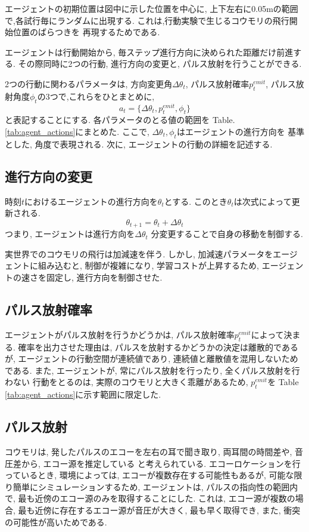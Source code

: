 \documentclass[../main]{subfiles}
\begin{document}
エージェントの初期位置は図中に示した位置を中心に,
上下左右に0.05\si{m}の範囲で,各試行毎にランダムに出現する.
これは,行動実験で生じるコウモリの飛行開始位置のばらつきを
再現するためである.

エージェントは行動開始から, 
毎ステップ進行方向に決められた距離だけ前進する.
その際同時に2つの行動, 
進行方向の変更と,
パルス放射を行うことができる.

2つの行動に関わるパラメータは,
方向変更角$\Delta\theta_t$,
パルス放射確率$p^{emit}_t$,
パルス放射角度$\phi_t$の3つで,これらをひとまとめに,
$$a_t=\{\Delta\theta_t, p^{emit}_t, \phi_t \}$$
と表記することにする.
各パラメータのとる値の範囲を
Table.\ref{tab:agent_actions}にまとめた.
ここで, $\Delta\theta_t, \phi_t$はエージェントの進行方向を
基準とした, 角度で表現される.
次に, エージェントの行動の詳細を記述する.

\subsection{進行方向の変更}
時刻$t$におけるエージェントの進行方向を$\theta_t$とする.
このとき$\theta_t$は次式によって更新される.
$$\theta_{t+1}=\theta_t+\Delta\theta_t$$
つまり, エージェントは進行方向を$\Delta\theta_t$
分変更することで自身の移動を制御する.

実世界でのコウモリの飛行は加減速を伴う.
しかし, 加減速パラメータをエージェントに組み込むと, 
制御が複雑になり, 学習コストが上昇するため, 
エージェントの速さを固定し, 進行方向を制御させた.

\subsection{パルス放射確率}
エージェントがパルス放射を行うかどうかは, 
パルス放射確率$p^{emit}_t$によって決まる.
確率を出力させた理由は, 
パルスを放射するかどうかの決定は離散的であるが, 
エージェントの行動空間が連続値であり, 
連続値と離散値を混用しないためである.
また, エージェントが, 
常にパルス放射を行ったり, 全くパルス放射を行わない
行動をとるのは, 実際のコウモリと大きく乖離があるため, 
$p^{emit}_t$を
Table \ref{tab:agent_actions}に示す範囲に限定した.

\subsection{パルス放射}
コウモリは, 発したパルスのエコーを左右の耳で聞き取り, 
両耳間の時間差や, 音圧差から, エコー源を推定している
と考えられている.
エコーロケーションを行っているとき, 
環境によっては, エコーが複数存在する可能性もあるが, 
可能な限り簡単にシミュレーションするため, 
エージェントは, パルスの指向性の範囲内で, 
最も近傍のエコー源のみを取得することにした.
これは, エコー源が複数の場合, 
最も近傍に存在するエコー源が音圧が大きく, 
最も早く取得でき, また, 衝突の可能性が高いためである.
\end{document}
